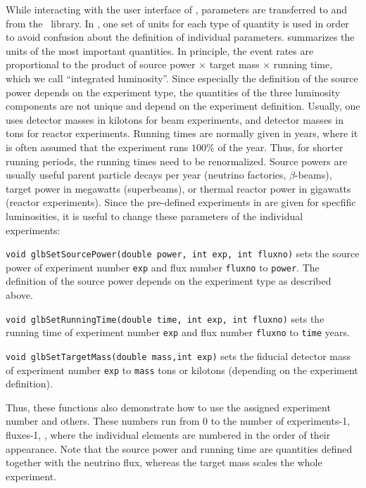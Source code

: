 While interacting with the user interface of \GLOBES , parameters are transferred to and from the \GLOBES\ library. In \GLOBES , one set of units 
for each type of quantity is used in order to avoid confusion about the definition of individual parameters.  summarizes the units of the most important quantities. In principle, the event rates are
proportional to the product of source power $\times$ target mass $\times$
 running time, which we call ``integrated luminosity''. Since especially the
 definition of the source power depends on the experiment type, the quantities of the three luminosity components
 are not unique and depend on the experiment definition. Usually,
 one uses detector masses in kilotons for beam experiments,
 and detector masses in tons for reactor experiments. Running times
 are normally given in years, where it is often assumed that the 
 experiment runs $100\%$ of the year. Thus, for shorter running periods,
 the running times need to be renormalized. Source powers are
 usually useful parent particle decays per year (neutrino factories,
 $\beta$-beams), target power in megawatts (superbeams), or thermal
 reactor power in gigawatts (reactor experiments).
%
Since the pre-defined experiments in  are given for specfific luminosities, it is useful to change these parameters of the
individual experiments:
\begin{function}
{\tt void glbSetSourcePower(double power, int exp, int fluxno)}
 sets the source power of experiment number {\tt exp} and flux number
 {\tt fluxno} to {\tt power}. The definition of the source power depends on the experiment type as described above.
\end{function}
\begin{function}
{\tt void glbSetRunningTime(double time, int exp, int fluxno)}
 sets the running time of experiment number {\tt exp} and flux number
 {\tt fluxno} to {\tt time} years.
\end{function}
\begin{function}
{\tt void glbSetTargetMass(double mass,int exp)}
sets the fiducial detector mass of experiment number {\tt exp} to {\tt mass} tons or kilotons (depending on the experiment definition).
\end{function}
Thus, these functions also demonstrate how to use the assigned experiment number and others. These numbers run from $0$ to the number of experiments-1, fluxes-1, \etc, where the individual elements are numbered in the order of their appearance. 
 Note that the source power and running time are quantities defined
together with the neutrino flux, whereas the target mass scales the whole
experiment.

